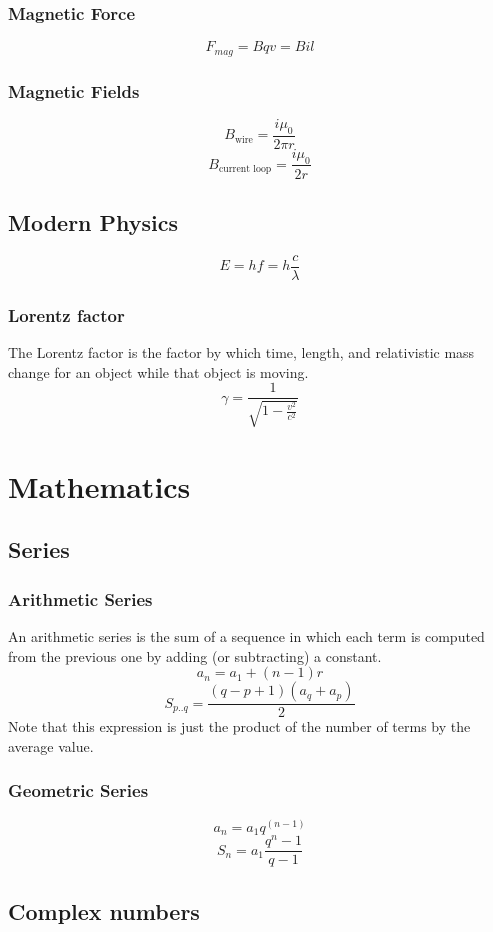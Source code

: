 \documentclass{book}
\newcommand*\reciprocal[1]{\frac{1}{#1}}
\begin{document}
\subsection{Magnetic Force}
\[F_{mag} = B q v = B i l\]

\subsection{Magnetic Fields}
\[B_{\text{wire}} = \frac{i \mu_0}{2 \pi r}\]
\[B_{\text{current loop}} = \frac{i \mu_0}{2 r}\]

\section{Modern Physics}
\[E = hf = h\frac{c}{\lambda}\]

\subsection{Lorentz factor}
The Lorentz factor is the factor by which time, length, and relativistic mass
change for an object while that object is moving.
\[\gamma = \reciprocal{\sqrt{1 - \frac{v^2}{c^2}}}\]

\chapter{Mathematics}

\section{Series}

\subsection{Arithmetic Series}
An arithmetic series is the sum of a sequence in which each term is computed from the previous one by adding (or subtracting) a constant.
\[a_n = a_1 + (n-1)r\]
\[S_{p..q} = \frac{(q - p + 1)(a_q + a_p)}{2}\]
Note that this expression is just the product of the number of terms by the average value.

\subsection{Geometric Series}
\[a_n = a_1 q^{(n-1)}\]
\[S_n = a_1 \frac{q^n - 1}{q-1}\]

\section{Complex numbers}
\end{document}
